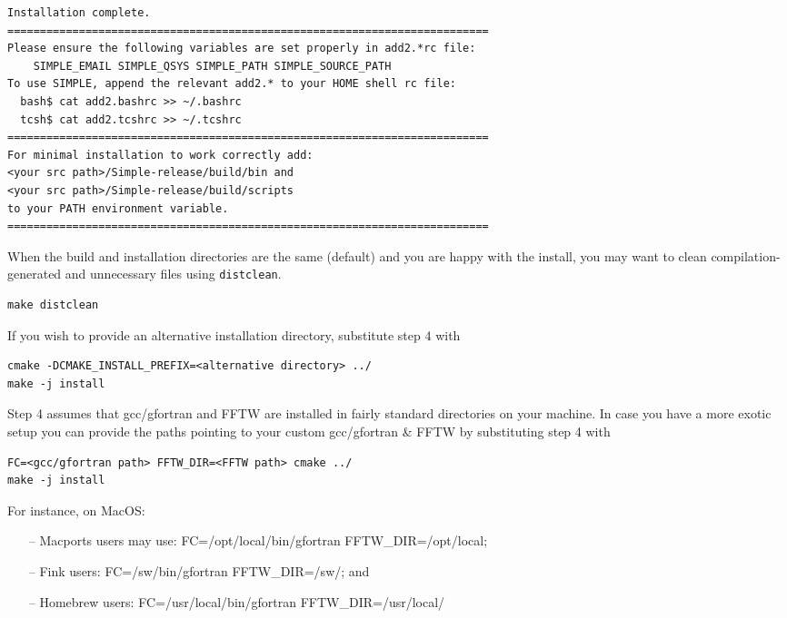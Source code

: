 \documentclass[a4paper,11pt]{article}
\begin{document}
\begin{Verbatim}[commandchars=+\[\],fontsize=\small,breaklines=true]
Installation complete.
==========================================================================
Please ensure the following variables are set properly in add2.*rc file:
    SIMPLE_EMAIL SIMPLE_QSYS SIMPLE_PATH SIMPLE_SOURCE_PATH
To use SIMPLE, append the relevant add2.* to your HOME shell rc file:
  bash$ cat add2.bashrc >> ~/.bashrc
  tcsh$ cat add2.tcshrc >> ~/.tcshrc
==========================================================================
For minimal installation to work correctly add:
<your src path>/Simple-release/build/bin and
<your src path>/Simple-release/build/scripts
to your PATH environment variable.
==========================================================================
\end{Verbatim}

\noindent{}When the build and installation directories are the same (default) and you are
happy with the install, you may want to clean compilation-generated and
unnecessary files using \texttt{distclean}.

\begin{Verbatim}[commandchars=+\[\],fontsize=\small,breaklines=true]
make distclean
\end{Verbatim}

\noindent{}If you wish to provide an alternative installation directory, substitute step 4 with

\begin{Verbatim}[commandchars=+\[\],fontsize=\small,breaklines=true]
cmake -DCMAKE_INSTALL_PREFIX=<alternative directory> ../
make -j install
\end{Verbatim}

\noindent{}Step 4 assumes that gcc/gfortran and FFTW are installed in fairly standard directories on your machine. In case you have a 
more exotic setup you can provide the paths pointing to your custom gcc/gfortran \& FFTW by substituting step 4 with

\begin{Verbatim}[commandchars=+\[\],fontsize=\small,breaklines=true]
FC=<gcc/gfortran path> FFTW_DIR=<FFTW path> cmake ../
make -j install
\end{Verbatim}

\noindent{}For instance, on MacOS:
\begin{itemize}
	\item[--] Macports users may use: FC=/opt/local/bin/gfortran FFTW\_DIR=/opt/local;
	\item[--] Fink users: FC=/sw/bin/gfortran FFTW\_DIR=/sw/; and
	\item[--] Homebrew users: FC=/usr/local/bin/gfortran FFTW\_DIR=/usr/local/
\end{itemize}
\end{document}
